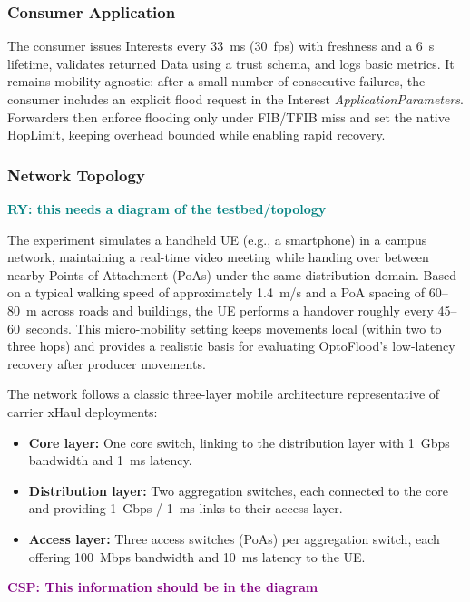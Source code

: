 \documentclass[10pt,conference]{IEEEtran}
\newcommand{\csp}[1]{\textbf{\textcolor{purple}{CSP: #1}}}
\newcommand{\ryo}[1]{\textbf{\textcolor{teal}{RY: #1}}}
\begin{document}
\subsubsection{Consumer Application}

The consumer issues Interests every 33~ms (30~fps) with freshness and a 6~s lifetime, validates returned Data using a trust schema, and logs basic metrics. It remains mobility-agnostic: after a small number of consecutive failures, the consumer includes an explicit flood request in the Interest \textit{ApplicationParameters}. Forwarders then enforce flooding only under FIB/TFIB miss and set the native HopLimit, keeping overhead bounded while enabling rapid recovery.

\subsubsection{Network Topology}
\ryo{this needs a diagram of the testbed/topology}

The experiment simulates a handheld UE (e.g., a smartphone) in a campus network, maintaining a real-time video meeting while handing over between nearby Points of Attachment (PoAs) under the same distribution domain. Based on a typical walking speed of approximately 1.4~m/s and a PoA spacing of 60--80~m across roads and buildings, the UE performs a handover roughly every 45--60~seconds. This micro-mobility setting keeps movements local (within two to three hops) and provides a realistic basis for evaluating OptoFlood’s low-latency recovery after producer movements.

The network follows a classic three-layer mobile architecture representative of carrier xHaul deployments:
\begin{itemize}
    \item \textbf{Core layer:} One core switch, linking to the distribution layer with 1~Gbps bandwidth and 1~ms latency.
    \item \textbf{Distribution layer:} Two aggregation switches, each connected to the core and providing 1~Gbps / 1~ms links to their access layer.
    \item \textbf{Access layer:} Three access switches (PoAs) per aggregation switch, each offering 100~Mbps bandwidth and 10~ms latency to the UE.
\end{itemize}
\csp{This information should be in the diagram}
\end{document}
